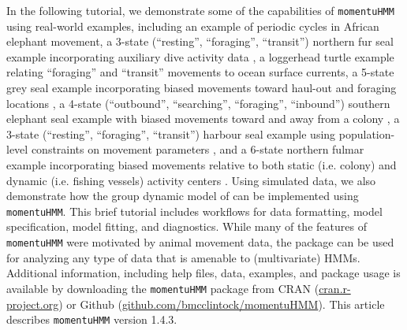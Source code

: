 \documentclass[12pt]{article}\usepackage[]{graphicx}\usepackage[]{color}
\begin{document}
In the following tutorial, we demonstrate some of the capabilities of \verb|momentuHMM| using real-world examples, including an example of periodic cycles in African elephant movement, a 3-state (``resting'', ``foraging'', ``transit'') northern fur seal example incorporating auxiliary dive activity data \citep{McClintockEtAl2014b}, a loggerhead turtle example relating ``foraging'' and ``transit'' movements to ocean surface currents, a 5-state grey seal example incorporating biased movements toward haul-out and foraging locations \citep{McClintockEtAl2012}, a 4-state (``outbound'', ``searching'', ``foraging'', ``inbound'') southern elephant seal example with biased movements toward and away from a colony \citep{MichelotEtAl2017}, a 3-state (``resting'', ``foraging'', ``transit'') harbour seal example using population-level constraints on movement parameters \citep{McClintockEtAl2013c}, and a 6-state northern fulmar example incorporating biased movements relative to both static (i.e. colony) and dynamic (i.e. fishing vessels) activity centers \citep{PirottaEtAl2018}. Using simulated data, we also demonstrate how the group dynamic model of \cite{LangrockEtAl2014} can be implemented using \verb|momentuHMM|. This brief tutorial includes workflows for data formatting, model specification, model fitting, and diagnostics. While many of the features of \verb|momentuHMM| were motivated by animal movement data, the package can be used for analyzing any type of data that is amenable to (multivariate) HMMs.  Additional information, including help files, data, examples, and package usage is available by downloading the \verb|momentuHMM| package from CRAN (\url{cran.r-project.org}) or Github (\url{github.com/bmcclintock/momentuHMM}). This article describes \verb|momentuHMM| version 1.4.3.
\end{document}
